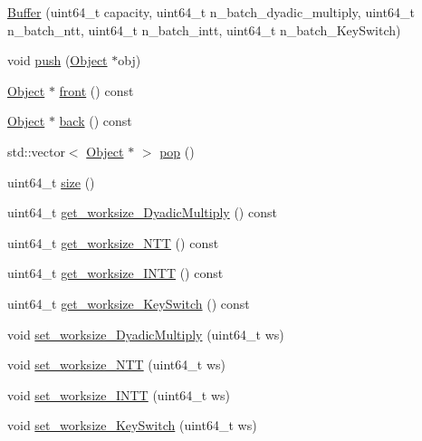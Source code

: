 \begin{DoxyCompactItemize}
\item 
\hyperlink{classintel_1_1hexl_1_1fpga_1_1Buffer_a6b279585d3df783620a0b3d7bd8c1c1e}{Buffer} (uint64\-\_\-t capacity, uint64\-\_\-t n\-\_\-batch\-\_\-dyadic\-\_\-multiply, uint64\-\_\-t n\-\_\-batch\-\_\-ntt, uint64\-\_\-t n\-\_\-batch\-\_\-intt, uint64\-\_\-t n\-\_\-batch\-\_\-\-Key\-Switch)
\item 
void \hyperlink{classintel_1_1hexl_1_1fpga_1_1Buffer_a6644861e903def2ff1aef60c94f4a8f6}{push} (\hyperlink{structintel_1_1hexl_1_1fpga_1_1Object}{Object} $\ast$obj)
\item 
\hyperlink{structintel_1_1hexl_1_1fpga_1_1Object}{Object} $\ast$ \hyperlink{classintel_1_1hexl_1_1fpga_1_1Buffer_aef26dde58c09c63303bf8c8ba4da6991}{front} () const 
\item 
\hyperlink{structintel_1_1hexl_1_1fpga_1_1Object}{Object} $\ast$ \hyperlink{classintel_1_1hexl_1_1fpga_1_1Buffer_a3e774f459e7b73d37393c5e3a5559622}{back} () const 
\item 
std\-::vector$<$ \hyperlink{structintel_1_1hexl_1_1fpga_1_1Object}{Object} $\ast$ $>$ \hyperlink{classintel_1_1hexl_1_1fpga_1_1Buffer_ac60152c34dc6d5ac1275db07293fc7dc}{pop} ()
\item 
uint64\-\_\-t \hyperlink{classintel_1_1hexl_1_1fpga_1_1Buffer_a03dbef5789ed9c28bd1b63b35164ab41}{size} ()
\item 
uint64\-\_\-t \hyperlink{classintel_1_1hexl_1_1fpga_1_1Buffer_a346da8900c5d0f689de15c754ff22095}{get\-\_\-worksize\-\_\-\-Dyadic\-Multiply} () const 
\item 
uint64\-\_\-t \hyperlink{classintel_1_1hexl_1_1fpga_1_1Buffer_a7814dc29476fa0be598a8f2f99043024}{get\-\_\-worksize\-\_\-\-N\-T\-T} () const 
\item 
uint64\-\_\-t \hyperlink{classintel_1_1hexl_1_1fpga_1_1Buffer_a7147f2da3c6cbeeaf13f70d725622a87}{get\-\_\-worksize\-\_\-\-I\-N\-T\-T} () const 
\item 
uint64\-\_\-t \hyperlink{classintel_1_1hexl_1_1fpga_1_1Buffer_ae984ebf36df2f7b8c8e3b69e9110be0e}{get\-\_\-worksize\-\_\-\-Key\-Switch} () const 
\item 
void \hyperlink{classintel_1_1hexl_1_1fpga_1_1Buffer_a3ed2fb00d1e5eb733162588d30a395df}{set\-\_\-worksize\-\_\-\-Dyadic\-Multiply} (uint64\-\_\-t ws)
\item 
void \hyperlink{classintel_1_1hexl_1_1fpga_1_1Buffer_aa6c582210106d0e189630dbd47a2b613}{set\-\_\-worksize\-\_\-\-N\-T\-T} (uint64\-\_\-t ws)
\item 
void \hyperlink{classintel_1_1hexl_1_1fpga_1_1Buffer_aa9d41687d0a35d75bb12b96373a3ddf4}{set\-\_\-worksize\-\_\-\-I\-N\-T\-T} (uint64\-\_\-t ws)
\item 
void \hyperlink{classintel_1_1hexl_1_1fpga_1_1Buffer_a1666c262e2297c3b64ae97ae0e206e2b}{set\-\_\-worksize\-\_\-\-Key\-Switch} (uint64\-\_\-t ws)
\end{DoxyCompactItemize}


